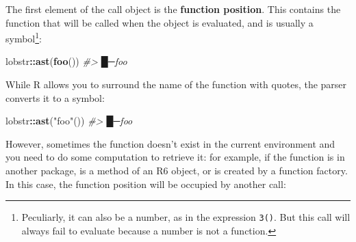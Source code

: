 \documentclass[]{book}
\newenvironment{Shaded}{\begin{snugshade}}{\end{snugshade}}
\newcommand{\CommentTok}[1]{\textcolor[rgb]{0.37,0.37,0.37}{\textit{#1}}}
\newcommand{\DecValTok}[1]{\textcolor[rgb]{0.06,0.06,0.06}{#1}}
\newcommand{\KeywordTok}[1]{\textcolor[rgb]{0.27,0.27,0.27}{\textbf{#1}}}
\newcommand{\NormalTok}[1]{#1}
\newcommand{\OperatorTok}[1]{\textcolor[rgb]{0.43,0.43,0.43}{\textbf{#1}}}
\newcommand{\StringTok}[1]{\textcolor[rgb]{0.5,0.5,0.5}{#1}}
\let\rmarkdownfootnote\footnote%
\def\footnote{\protect\rmarkdownfootnote}
\begin{document}

The first element of the call object is the \textbf{function position}. This contains the function that will be called when the object is evaluated, and is usually a symbol\footnote{Peculiarly, it can also be a number, as in the expression \texttt{3()}. But this call will always fail to evaluate because a number is not a function.}:

\begin{Shaded}
\begin{Highlighting}[]
\NormalTok{lobstr}\OperatorTok{::}\KeywordTok{ast}\NormalTok{(}\KeywordTok{foo}\NormalTok{())}
\CommentTok{#> █─foo}
\end{Highlighting}
\end{Shaded}

While R allows you to surround the name of the function with quotes, the parser converts it to a symbol:

\begin{Shaded}
\begin{Highlighting}[]
\NormalTok{lobstr}\OperatorTok{::}\KeywordTok{ast}\NormalTok{(}\StringTok{"foo"}\NormalTok{())}
\CommentTok{#> █─foo}
\end{Highlighting}
\end{Shaded}

However, sometimes the function doesn't exist in the current environment and you need to do some computation to retrieve it: for example, if the function is in another package, is a method of an R6 object, or is created by a function factory. In this case, the function position will be occupied by another call:

\begin{Shaded}
\end{Shaded}
\end{document}
